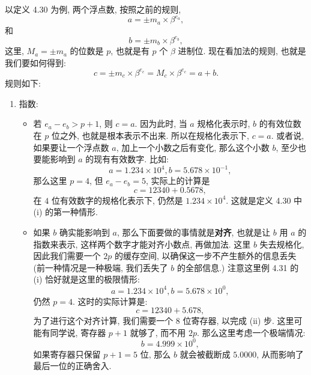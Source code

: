 \documentclass[a4paper]{ctexart}
\begin{document}
{以定义 4.30 为例, 两个浮点数, 按照之前的规则,
$$
a = \pm m_a \times \beta^{e_a},  
$$
和
$$
b = \pm m_b \times \beta^{e_b},  
$$
这里, $M_a = \pm m_a$ 的位数是 $p$, 也就是有 $p$ 个 $\beta$ 进制位.
现在看加法的规则, 也就是我们要如何得到:
$$
c = \pm m_c \times \beta^{e_c} = M_c \times \beta^{e_c} = a + b.
$$
规则如下:
\begin{enumerate}
\item 指数:
  \begin{itemize}
  \item 若 $e_a - e_b > p + 1$, 则 $c = a$. 因为此时,
    当 $a$ 规格化表示时, $b$ 的有效位数在 $p$ 位之外,
    也就是根本表示不出来. 所以在规格化表示下, $c = a$.
    或者说, 如果要让一个浮点数 $a$, 加上一个小数之后有变化,
    那么这个小数 $b$, 至少也要能影响到 $a$ 的现有有效数字.
    比如:
    $$
    a = 1.234 \times 10^4, b = 5.678 \times 10^{-1},
    $$
    那么这里 $p = 4$, 但 $e_a - e_b = 5$, 实际上的计算是
    $$
    c = 12340 + 0.5678, 
    $$
    在 $4$ 位有效数字的规格化表示下, 仍然是 $1.234 \times 10^4$.
    这就是定义 4.30 中 (i) 的第一种情形.  
  \item 如果 $b$ 确实能影响到 $a$, 那么下面要做的事情就是{\bf 对齐},
    也就是让 $b$ 用 $a$ 的指数来表示, 这样两个数字才能对齐小数点,
    再做加法. 这里 $b$ 失去规格化, 因此我们需要一个 $2 p$ 的缓存空间,
    以确保这一步不产生额外的信息丢失 (前一种情况是一种极端, 我们丢失了 $b$ 的全部信息.)
    注意这里例 4.31 的 (i) 恰好就是这里的极限情形:
    $$
    a = 1.234 \times 10^4, b = 5.678 \times 10^{0},
    $$
    仍然 $p = 4$. 这时的实际计算是:
    $$
    c = 12340 + 5.678, 
    $$
    为了进行这个对齐计算, 我们需要一个 $8$ 位寄存器, 以完成 (ii)
    步. 
    这里可能有同学说, 寄存器 $p + 1$ 就够了, 而不用 $2p$. 
    那么这里考虑一个极端情况:
    $$
    b = 4.999 \times 10^{0},
    $$
    如果寄存器只保留 $p + 1 = 5$ 位, 
    那么 $b$ 就会被截断成 $5.0000$, 从而影响了最后一位的正确舍入.
  

\end{itemize}
\end{enumerate}}
\end{document}
